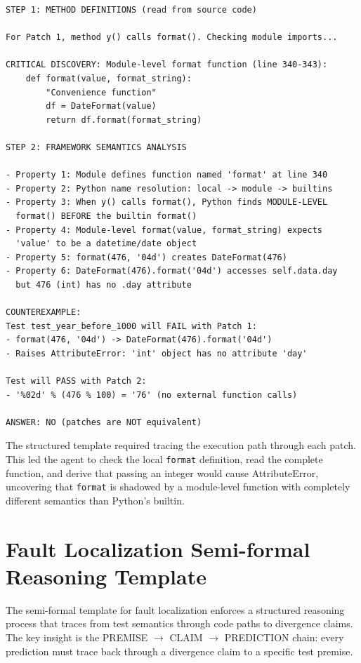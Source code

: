 \documentclass[]{meta}
\begin{document}
\begin{tcolorbox}[colback=gray!5, colframe=gray!50, boxrule=0.3pt, breakable]
\small
\begin{verbatim}
STEP 1: METHOD DEFINITIONS (read from source code)

For Patch 1, method y() calls format(). Checking module imports...

CRITICAL DISCOVERY: Module-level format function (line 340-343):
    def format(value, format_string):
        "Convenience function"
        df = DateFormat(value)
        return df.format(format_string)

STEP 2: FRAMEWORK SEMANTICS ANALYSIS

- Property 1: Module defines function named 'format' at line 340
- Property 2: Python name resolution: local -> module -> builtins
- Property 3: When y() calls format(), Python finds MODULE-LEVEL
  format() BEFORE the builtin format()
- Property 4: Module-level format(value, format_string) expects
  'value' to be a datetime/date object
- Property 5: format(476, '04d') creates DateFormat(476)
- Property 6: DateFormat(476).format('04d') accesses self.data.day
  but 476 (int) has no .day attribute

COUNTEREXAMPLE:
Test test_year_before_1000 will FAIL with Patch 1:
- format(476, '04d') -> DateFormat(476).format('04d')
- Raises AttributeError: 'int' object has no attribute 'day'

Test will PASS with Patch 2:
- '%02d' % (476 % 100) = '76' (no external function calls)

ANSWER: NO (patches are NOT equivalent)
\end{verbatim}
\end{tcolorbox}

The structured template required tracing the execution path through each patch. This led the agent to check the local \texttt{format} definition, read the complete function, and derive that passing an integer would cause AttributeError, uncovering that \texttt{format} is shadowed by a module-level function with completely different semantics than Python's builtin.

\section{Fault Localization Semi-formal Reasoning Template}
\label{app:fl-prompt}

The semi-formal template for fault localization enforces a structured reasoning process that traces from test semantics through code paths to divergence claims. The key insight is the PREMISE $\rightarrow$ CLAIM $\rightarrow$ PREDICTION chain: every prediction must trace back through a divergence claim to a specific test premise.
\end{document}
